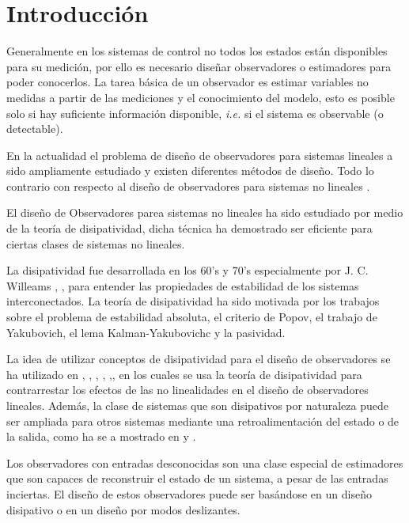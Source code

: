 \documentclass[11pt,letterpaper,twoside,openright]{report}
\begin{document}
	\chapter{Introducción}
	Generalmente en los sistemas de control no todos los estados están disponibles para su medición, por ello  es necesario diseñar observadores o estimadores para poder conocerlos. La tarea básica de un observador es estimar variables no medidas a partir de las mediciones y el conocimiento del modelo, esto es posible solo si hay suficiente información disponible, \textit{i.e.} si el sistema es observable (o detectable). \vspace{.3cm}
	
	En la actualidad el problema de diseño de observadores para sistemas lineales a sido ampliamente estudiado y existen diferentes métodos de diseño. Todo lo contrario con respecto al diseño de observadores para sistemas no lineales \cite{Besancon2007}.  \vspace{.3cm}

	El diseño de Observadores parea sistemas no lineales  ha sido estudiado por medio de la teoría de disipatividad, dicha técnica ha demostrado ser eficiente para ciertas clases de sistemas no lineales. \vspace{.3cm}
	
	La disipatividad fue desarrollada en los 60's y 70's especialmente por J. C. Willeams \cite{Willems1972PartI}, \cite{Willems1972PartII}, para entender las propiedades de estabilidad de los sistemas interconectados. La teoría de disipatividad ha sido motivada por los trabajos sobre el problema de estabilidad absoluta, el criterio de Popov, el trabajo de Yakubovich, el lema Kalman-Yakubovichc
	 y la pasividad.\vspace{.3cm}
	
	 La idea de utilizar conceptos de disipatividad para el diseño de observadores se ha utilizado en \cite{Moreno2001}, \cite{Shim2003}, \cite{Moreno2004}, \cite{Moreno2005}, \cite{Rochacozatl2004},\cite{Rochacozatl2011}, en los cuales se usa la teoría de disipatividad para contrarrestar los efectos de las no linealidades en el diseño de observadores lineales. Además, la clase de sistemas que son disipativos por naturaleza puede ser ampliada para otros sistemas mediante una retroalimentación del estado o de la salida, como ha se a mostrado en \cite{Byrnes1991} y \cite{Rocha2001}.  \vspace{.3cm}
	 
	 
	Los observadores con entradas desconocidas son una clase especial de estimadores que son capaces de reconstruir el estado de un sistema, a pesar de las entradas inciertas. El diseño de estos observadores puede ser basándose en un diseño disipativo o en un diseño por modos deslizantes.\vspace{.3cm}
	
\end{document}
